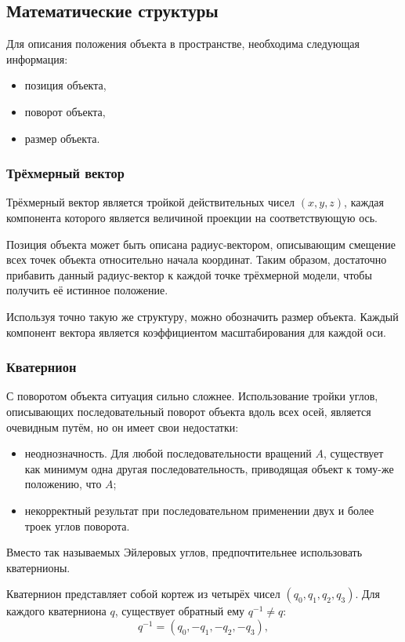 \documentclass[a4paper, 14pt]{report} %
\begin{document}
	\subsection{Математические структуры}
	Для описания положения объекта в пространстве, необходима следующая информация:
	\begin{itemize}
		\item позиция объекта,
		\item поворот объекта,
		\item размер объекта.
	\end{itemize}
	
	\subsubsection{Трёхмерный вектор}
	Трёхмерный вектор является тройкой действительных чисел $(x, y, z)$, каждая компонента которого является величиной проекции на соответствующую ось.
	
	Позиция объекта может быть описана радиус-вектором, описывающим смещение всех точек объекта относительно начала координат. Таким образом, достаточно прибавить данный радиус-вектор к каждой точке трёхмерной модели, чтобы получить её истинное положение.
	
	Используя точно такую же структуру, можно обозначить размер объекта. Каждый компонент вектора является коэффициентом масштабирования для каждой оси.
		
	\subsubsection{Кватернион}
	С поворотом объекта ситуация сильно сложнее. Использование тройки углов, описывающих последовательный поворот объекта вдоль всех осей, является очевидным путём, но он имеет свои недостатки:
	\begin{itemize}
		\item неоднозначность. Для любой последовательности вращений $A$, существует как минимум одна другая последовательность, приводящая объект к тому-же положению, что $A$;
		\item некорректный результат при последовательном применении двух и более троек углов поворота.
	\end{itemize}

	Вместо так называемых Эйлеровых углов, предпочтительнее использовать кватернионы\cite{quaternions}.
	
	Кватернион представляет собой кортеж из четырёх чисел $(q_0, q_1, q_2, q_3)$. Для каждого кватерниона $q$, существует обратный ему $q^{-1}\ne q$:
	\begin{equation}
		q^{-1}=(q_0, -q_1, -q_2, -q_3),
	\end{equation}
	
\end{document}
